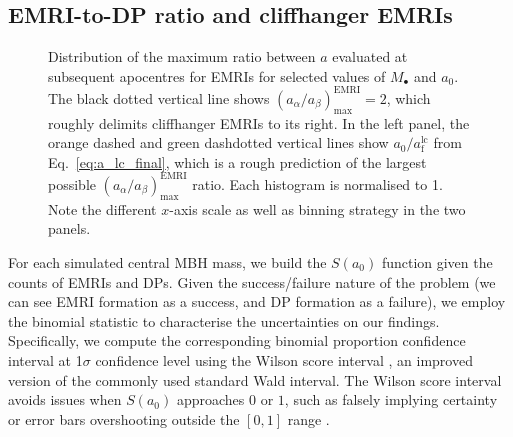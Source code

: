 \documentclass[desactivate]{aa}
\begin{document}
    \subsection{EMRI-to-DP ratio and cliffhanger EMRIs} \label{sec:main_res}

            \begin{figure}
            \centering
            \caption{Distribution of the maximum ratio between $a$ evaluated at subsequent apocentres for EMRIs for selected values of $M_\bullet$ and $a_0$. The black dotted vertical line shows $(a_\alpha/a_\beta)_\mathrm{max}^\mathrm{EMRI} = 2$, which roughly delimits cliffhanger EMRIs to its right. In the left panel, the orange dashed and green dashdotted vertical lines show $a_0/a_\mathrm{f}^\mathrm{lc}$ from Eq.\ \eqref{eq:a_lc_final}, which is a rough prediction of the largest possible $(a_\alpha/a_\beta)_\mathrm{max}^\mathrm{EMRI}$ ratio. Each histogram is normalised to 1. Note the different $x$-axis scale as well as binning strategy in the two panels.}
            \label{fig:histo}
        \end{figure}

        For each simulated central MBH mass, we build the $S(a_0)$ function given the counts of EMRIs and DPs. Given the success/failure nature of the problem (we can see EMRI formation as a success, and DP formation as a failure), we employ the binomial statistic to characterise the uncertainties on our findings. Specifically, we compute the corresponding binomial proportion confidence interval at 1$\sigma$ confidence level using the Wilson score interval \citep{doi:10.1080/01621459.1927.10502953}, an improved version of the commonly used standard Wald interval. The Wilson score interval avoids issues when $S(a_0)$ approaches $0$ or $1$, such as falsely implying certainty or error bars overshooting outside the $[0,1]$ range \citep{10.1214/ss/1009213286}. 
\end{document}
